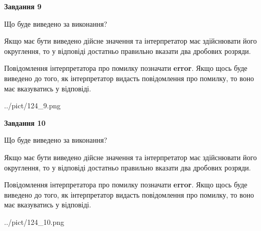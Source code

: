 \documentclass[12pt, ukrainian]{article}
\begin{document}
{\begin {Large}
{\begin {center}\textbf{Завдання 9}\end {center}}\par
Що буде виведено за виконання? \par

Якщо має бути виведено дійсне значення та інтерпретатор має здійснювати його округлення, 
то у відповіді достатньо правильно вказати два дробових розряди.

Повідомлення інтерпретатора про помилку позначати \textbf{error}.
Якщо щось буде виведено до того, як інтерпретатор видасть повідомлення про помилку, 
то воно має вказуватись у відповіді. \par

\begin{center}
	{../pict/124_9.png}
\end{center}
\newpage

{\begin {center}\textbf{Завдання 10}\end {center}}\par
Що буде виведено за виконання? \par

Якщо має бути виведено дійсне значення та інтерпретатор має здійснювати його округлення, 
то у відповіді достатньо правильно вказати два дробових розряди.

Повідомлення інтерпретатора про помилку позначати \textbf{error}.
Якщо щось буде виведено до того, як інтерпретатор видасть повідомлення про помилку, 
то воно має вказуватись у відповіді. \par

\begin{center}
	{../pict/124_10.png}
\end{center}
\newpage

\end {Large}}
\end{document}
